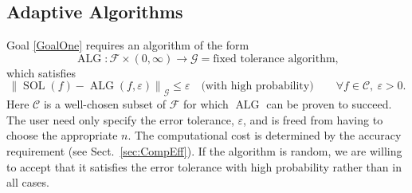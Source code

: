 \documentclass[11pt]{NSFamsart}
\DeclareMathOperator{\SOL}{SOL}
\DeclareMathOperator{\ALG}{ALG}
\newcommand{\calc}{{\mathcal{C}}}
\newcommand{\calf}{{\mathcal{F}}}
\newcommand{\calg}{{\mathcal{G}}}
\newcommand{\norm}[2][{}]{\ensuremath{\left \lVert #2 \right \rVert}_{#1}}
\begin{document}
\subsection{Adaptive Algorithms} \label{sec:AdapAlgo}

Goal \ref{GoalOne} requires an algorithm of the form
\begin{equation*}
    \ALG : \calf \times (0,\infty) \to \calg = \text{fixed tolerance algorithm},
\end{equation*}
which satisfies
\begin{equation}
      \tag{ALG-CRIT} \label{AlgErr}
    \norm[\calg]{\SOL(f) - \ALG(f,\varepsilon)} \le \varepsilon \quad \text{(with high probability)} \qquad \forall f\in \calc, \ \varepsilon >0.
\end{equation}
Here $\calc$ is a well-chosen subset of $\calf$ for which $\ALG$ can be proven to succeed.  The user need only specify the error tolerance, $\varepsilon$, and is freed from having to choose the appropriate $n$.  The computational cost is determined by the accuracy requirement (see Sect.\ \ref{sec:CompEff}).  If the algorithm is random, we are willing to accept that it satisfies the error tolerance with high probability rather than in all cases.  
\end{document}
